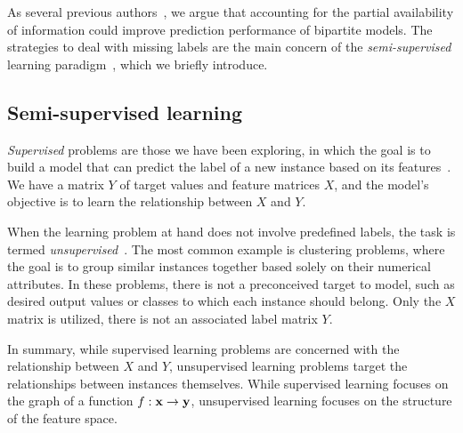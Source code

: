 
As several previous authors~\cite{pahikkala2015more,liu2017lpinrlmf,he2017simboost}, %
we argue that accounting for the partial availability of information
could improve prediction performance of bipartite models. %
The strategies to deal with missing labels are the main concern of the \emph{semi-supervised} learning paradigm~\cite{chapelle2006semisupervised,vanengelen2020survey,zhu2022introduction}, which we briefly introduce.


\subsection{Semi-supervised learning}
\label{sec:semi-supervised learning}

\emph{Supervised} problems are those we have been exploring, in which the
goal is to build a model that can predict the label of a new instance based on its features~\cite[p.~9]{hastie2001elements}. We have a matrix $Y$ of target values and feature matrices $X$, and the model's objective is to learn the relationship between $X$ and $Y$.


When the learning problem at hand does not involve predefined labels, the task is termed \emph{unsupervised}~\cite[p.~486]{hastie2001elements}. The most common example is clustering problems, where the goal is to group similar instances together based solely on their numerical attributes. In these problems, there is not a preconceived target to model, such as desired output values or classes to which each instance should belong. Only the $X$ matrix is utilized, there is not an associated label matrix $Y$.

In summary, while supervised learning problems are concerned with the relationship between $X$ and $Y$, unsupervised learning problems target the relationships between instances themselves.
While supervised learning focuses on the graph of a function $f: \mathbf{x} \to \mathbf{y}$, unsupervised learning focuses on the structure of the feature space.

